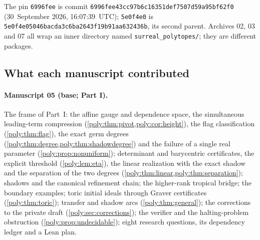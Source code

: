 \documentclass[11pt,a4paper]{article}
\numberwithin{equation}{section}
\theoremstyle{plain}
\begin{document}
The pin \texttt{6996fee} is commit
\texttt{6996fee43cc97b6c16351def7507d59a95bf62f0} (30~September 2026,
16:07:39~UTC); \texttt{5e0f4e0} is
\texttt{5e0f4e05046bacda3c6ba2643f19b91aa632436b}, its second parent.
Archives 02, 03 and 07 all wrap an inner directory named
\nolinkurl{surreal_polytopes/}; they are different packages.

\subsection{What each manuscript contributed}

\paragraph{Manuscript 05 (base; Part I).} The frame of Part~I: the affine
gauge and dependence space, the simultaneous leading-term compression
(\cref{poly:thm:pivot,poly:cor:height}), the flag classification
(\cref{poly:thm:flag}), the exact germ degrees
(\cref{poly:thm:degree,poly:thm:shadowdegree}) and the failure of a single
real parameter (\cref{poly:prop:nonuniform}); determinant and barycentric
certificates, the explicit threshold (\cref{poly:lem:eta}), the linear
realization with the exact shadow and the separation of the two degrees
(\cref{poly:thm:linear,poly:thm:separation}); shadows and the canonical
refinement chain; the higher-rank tropical bridge; the boundary examples;
toric initial ideals through Graver certificates (\cref{poly:thm:toric});
transfer and shadow arcs (\cref{poly:thm:general}); the corrections to the
private draft (\cref{poly:sec:corrections}); the verifier and the
halting-problem obstruction (\cref{poly:prop:undecidable}); eight research
questions, its dependency ledger and a Lean plan.
\end{document}
